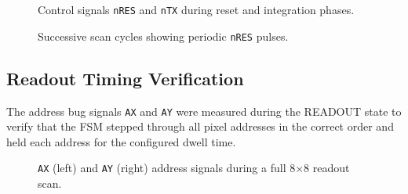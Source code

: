 \begin{figure}[h]
  \centering
  \caption{Control signals \texttt{nRES} and \texttt{nTX} during reset and integration phases.}
  \label{fig:ctrl_test1}
\end{figure}

\begin{figure}[h]
  \centering
  \caption{Successive scan cycles showing periodic \texttt{nRES} pulses.}
  \label{fig:ctrl_test2}
\end{figure}

\subsection{Readout Timing Verification}

The address bug signals \texttt{AX} and \texttt{AY} were measured during the READOUT state to verify that the FSM stepped through all pixel addresses in the correct order and held each address for the configured dwell time.

\begin{figure}[h]
  \centering
  \caption{\texttt{AX} (left) and \texttt{AY} (right) address signals during a full 8$\times$8 readout scan.}
  \label{fig:ax_ay}
\end{figure}

